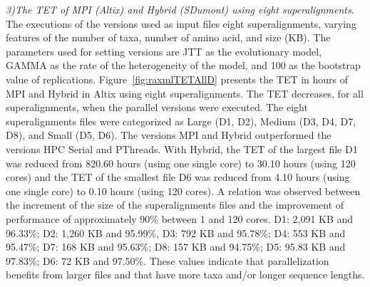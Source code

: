 \textit{3)The TET of \raxml MPI (Altix) and \raxml Hybrid (SDumont) using eight superalignments}. The executions of the \raxml versions used as input files eight superalignments, varying features of the number of taxa, number of amino acid, and size (KB). The parameters used for setting \raxml versions are JTT as the evolutionary model, GAMMA as the rate of the heterogeneity of the model, and 100 as the bootstrap value of replications. Figure~\ref{fig:raxmlTETAllD} presents the TET in hours of \raxml MPI and \raxml Hybrid in Altix using eight superalignments. The TET decreases, for all superalignments, when the \raxml parallel versions were executed. The eight superalignments files were categorized as Large (D1, D2), Medium (D3, D4, D7, D8), and Small (D5, D6). The versions \raxml MPI and \raxml Hybrid outperformed the versions \raxml HPC Serial and \raxml PThreads. With \raxml Hybrid, the TET of the largest file D1 was reduced from 820.60 hours (using one single core) to 30.10 hours (using 120 cores) and the TET of the smallest file D6 was reduced from 4.10 hours (using one single core) to 0.10 hours (using 120 cores). A relation was observed between the increment of the size of the superalignments files and the improvement of performance of approximately 90\% between 1 and 120 cores. D1: 2,091 KB and 96.33\%; D2: 1,260 KB and 95.99\%, D3: 792 KB and 95.78\%; D4: 553 KB and 95.47\%; D7: 168 KB and 95.63\%; D8: 157 KB and 94.75\%; D5: 95.83 KB and 97.83\%; D6: 72 KB and 97.50\%. These values indicate that parallelization benefits from larger files and that have more taxa and/or longer sequence lengths.

